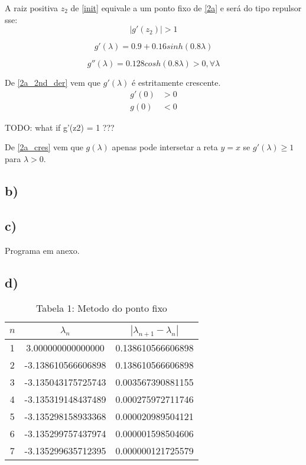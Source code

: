 \documentclass[a4paper, 12pt]{article}
\begin{document}
	\par
	A raiz positiva $z_2$ de \eqref{init} equivale a um ponto fixo de \eqref{2a} e será do tipo repulsor sse:
	$$|g'(z_2)| > 1$$

	\begin{equation}
		g'(\lambda) = 0.9 + 0.16sinh(0.8\lambda)
	\end{equation}

	\begin{equation} \label{2a_2nd_der}
		g''(\lambda) = 0.128cosh(0.8\lambda) > 0, \forall \lambda
	\end{equation}

	\par
	De \eqref{2a_2nd_der} vem que $g'(\lambda)$ é estritamente crescente.
	\begin{equation} \label{2a_cres}
	\begin{split}
		g'(0) &> 0 \\
		g(0) &< 0
	\end{split}
	\end{equation}

	TODO: what if g'(z2) = 1 ???
	\par
	De \eqref{2a_cres} vem que $g(\lambda)$ apenas pode intersetar a reta $y = x$ se $g'(\lambda) \geqslant 1$ para $\lambda > 0$.


\subsection*{b)}
\subsection*{c)}
	Programa em anexo.
\subsection*{d)}

\begin{table}[]
\setlength{\tabcolsep}{0.5cm} %
\renewcommand{\arraystretch}{1.5} %
\centering
\caption{Tabela 1: Metodo do ponto fixo}
\label{my-label}
\begin{tabular}{|c|c|c|}
 $n$ & $\lambda _n$ &  $| \lambda _{n+1} - \lambda _n |$ \\\hline
 1& 3.000000000000000 & 0.138610566606898  \\
 2& -3.138610566606898 & 0.138610566606898 \\
 3& -3.135043175725743 & 0.003567390881155 \\
 4& -3.135319148437489 & 0.000275972711746 \\
 5& -3.135298158933368 & 0.000020989504121 \\
 6& -3.135299757437974 & 0.000001598504606 \\
 7& -3.135299635712395 & 0.000000121725579 \\


\end{tabular}
\end{table}
\end{document}
